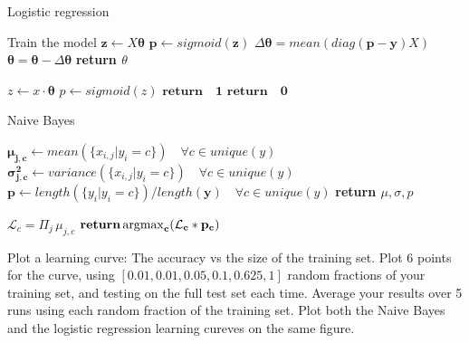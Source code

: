\documentclass[11pt,largemargins]{homework}
\newcommand{\argmax}{\operatornamewithlimits{argmax}}
\begin{document}
\begin{alphaparts}
\begin{arabicparts}
	\begin{algorithm}
		\caption{Logistic regression}
		\begin{algorithmic}
			\Comment Train the model
				\State $\mathbf{z}\gets X\mathbf{\theta}$
				\State $\mathbf{p} \gets sigmoid(\mathbf{z})$
				\State $\Delta\mathbf{\theta}=mean(diag(\mathbf{p}-\mathbf{y})X)$
				\State $\mathbf{\theta}=\mathbf{\theta} - \Delta\mathbf{\theta}$
				\EndFor
				\State \textbf{return $\theta$}
			\EndProcedure
			\item[]
				\State $z\gets x\cdot\mathbf{\theta}$
				\State $p \gets sigmoid(z)$
				\State $\mathbf{return \quad 1}$
				\Else
				\State $\mathbf{return \quad 0}$
				\EndIf
			\EndProcedure
		\end{algorithmic}
	\end{algorithm}
	\begin{algorithm}
		\caption{Naive Bayes}
		\begin{algorithmic}
			\Procedure{train}{$X, y$}
				\State $\mathbf{\mu_{j, c}} \gets mean(\{x_{i, j} |y_i = c\})\quad \forall c \in unique(y)$
				\State $\mathbf{\sigma^2_{j, c}} \gets variance(\{x_{i, j} |y_i = c\}) \quad \forall c \in unique(y)$
				\State $\mathbf{p} \gets length(\{y_{i}|y_{i}=c\})/length(\mathbf{y}) \quad \forall c \in unique(y)$
				\State \textbf{return $\mu, \sigma, p$}
			\EndProcedure
			\item[]
				\Procedure{predict}{$x, \mathbf{\mu}, \mathbf{\sigma}, \mathbf{p}$}
			\State $\mathcal{L}_c = \Pi_j \, \mu_{j,c}$	
			\State $\mathbf {\textbf{return} \argmax_c(\mathcal{L}_c*\mathbf{p}_c)}$
			\EndProcedure
		\end{algorithmic}
	\end{algorithm}
	\questionpart
	Plot a learning curve: The accuracy vs the size of the training set. Plot 6 points for the curve, using $[0.01, 0.01, 0.05, 0.1, 0.625, 1]$ random fractions of your training set, and testing on the full test set each time. Average your results over 5 runs using each random fraction of the training set. Plot both the Naive Bayes and the logistic regression learning cureves on the same figure. 


\end{arabicparts}
\end{alphaparts}
\end{document}
